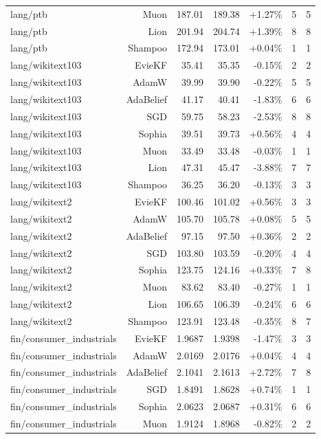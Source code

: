 \begin{table}[t]
\begin{tabular}{lrrrrrr}
lang/ptb & Muon & 187.01 & 189.38 & +1.27\% & 5 & 5 \\
lang/ptb & Lion & 201.94 & 204.74 & +1.39\% & 8 & 8 \\
lang/ptb & Shampoo & 172.94 & 173.01 & +0.04\% & 1 & 1 \\
lang/wikitext103 & EvieKF & 35.41 & 35.35 & -0.15\% & 2 & 2 \\
lang/wikitext103 & AdamW & 39.99 & 39.90 & -0.22\% & 5 & 5 \\
lang/wikitext103 & AdaBelief & 41.17 & 40.41 & -1.83\% & 6 & 6 \\
lang/wikitext103 & SGD & 59.75 & 58.23 & -2.53\% & 8 & 8 \\
lang/wikitext103 & Sophia & 39.51 & 39.73 & +0.56\% & 4 & 4 \\
lang/wikitext103 & Muon & 33.49 & 33.48 & -0.03\% & 1 & 1 \\
lang/wikitext103 & Lion & 47.31 & 45.47 & -3.88\% & 7 & 7 \\
lang/wikitext103 & Shampoo & 36.25 & 36.20 & -0.13\% & 3 & 3 \\
lang/wikitext2 & EvieKF & 100.46 & 101.02 & +0.56\% & 3 & 3 \\
lang/wikitext2 & AdamW & 105.70 & 105.78 & +0.08\% & 5 & 5 \\
lang/wikitext2 & AdaBelief & 97.15 & 97.50 & +0.36\% & 2 & 2 \\
lang/wikitext2 & SGD & 103.80 & 103.59 & -0.20\% & 4 & 4 \\
lang/wikitext2 & Sophia & 123.75 & 124.16 & +0.33\% & 7 & 8 \\
lang/wikitext2 & Muon & 83.62 & 83.40 & -0.27\% & 1 & 1 \\
lang/wikitext2 & Lion & 106.65 & 106.39 & -0.24\% & 6 & 6 \\
lang/wikitext2 & Shampoo & 123.91 & 123.48 & -0.35\% & 8 & 7 \\
fin/consumer\_industrials & EvieKF & 1.9687 & 1.9398 & -1.47\% & 3 & 3 \\
fin/consumer\_industrials & AdamW & 2.0169 & 2.0176 & +0.04\% & 4 & 4 \\
fin/consumer\_industrials & AdaBelief & 2.1041 & 2.1613 & +2.72\% & 7 & 8 \\
fin/consumer\_industrials & SGD & 1.8491 & 1.8628 & +0.74\% & 1 & 1 \\
fin/consumer\_industrials & Sophia & 2.0623 & 2.0687 & +0.31\% & 6 & 6 \\
fin/consumer\_industrials & Muon & 1.9124 & 1.8968 & -0.82\% & 2 & 2 \\

\end{tabular}
\end{table}
